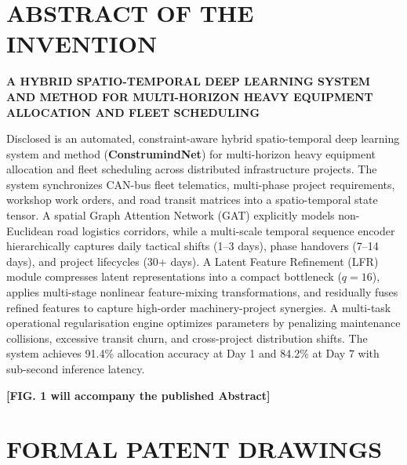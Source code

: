\documentclass[11pt,a4paper]{article}
\begin{document}
\section*{ABSTRACT OF THE INVENTION}
\begin{center}
    \textbf{A HYBRID SPATIO-TEMPORAL DEEP LEARNING SYSTEM AND METHOD FOR MULTI-HORIZON HEAVY EQUIPMENT ALLOCATION AND FLEET SCHEDULING}
\end{center}

\noindent Disclosed is an automated, constraint-aware hybrid spatio-temporal deep learning system and method (\textbf{ConstrumindNet}) for multi-horizon heavy equipment allocation and fleet scheduling across distributed infrastructure projects. The system synchronizes CAN-bus fleet telematics, multi-phase project requirements, workshop work orders, and road transit matrices into a spatio-temporal state tensor. A spatial Graph Attention Network (GAT) explicitly models non-Euclidean road logistics corridors, while a multi-scale temporal sequence encoder hierarchically captures daily tactical shifts (1--3 days), phase handovers (7--14 days), and project lifecycles (30+ days). A Latent Feature Refinement (LFR) module compresses latent representations into a compact bottleneck ($q = 16$), applies multi-stage nonlinear feature-mixing transformations, and residually fuses refined features to capture high-order machinery-project synergies. A multi-task operational regularisation engine optimizes parameters by penalizing maintenance collisions, excessive transit churn, and cross-project distribution shifts. The system achieves 91.4\% allocation accuracy at Day 1 and 84.2\% at Day 7 with sub-second inference latency.

\vspace{1.5em}
\noindent \textbf{[FIG. 1 will accompany the published Abstract]}

\newpage

\section*{FORMAL PATENT DRAWINGS}
\end{document}

